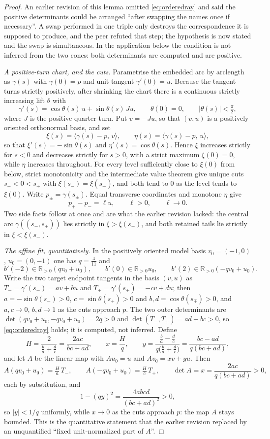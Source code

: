\begin{proof}
An earlier revision of this lemma omitted \eqref{eq:orderedray} and said the
positive determinants could be arranged ``after swapping the names once if
necessary''. A swap performed in one triple only destroys the correspondence it
is supposed to produce, and the peer refuted that step; the hypothesis is now
stated and the swap is simultaneous. In the application below the condition is
not inferred from the two cones: both determinants are computed and are
positive.

\emph{A positive-turn chart, and the cuts.} Parametrise the embedded arc by
arclength as $\gamma(s)$ with $\gamma(0)=p$ and unit tangent $\gamma'(0)=u$.
Because the tangent turns strictly positively, after shrinking the chart there
is a continuous strictly increasing lift $\theta$ with
\[
   \gamma'(s)=\cos\theta(s)\,u+\sin\theta(s)\,Ju,\qquad
   \theta(0)=0,\qquad |\theta(s)|<\tfrac\pi2,
\]
where $J$ is the positive quarter turn. Put $v=-Ju$, so that $(v,u)$ is a
positively oriented orthonormal basis, and set
\[
   \xi(s)=\langle\gamma(s)-p,\,v\rangle,\qquad
   \eta(s)=\langle\gamma(s)-p,\,u\rangle,
\]
so that $\xi'(s)=-\sin\theta(s)$ and $\eta'(s)=\cos\theta(s)$. Hence $\xi$
increases strictly for $s<0$ and decreases strictly for $s>0$, with a strict
maximum $\xi(0)=0$, while $\eta$ increases throughout. For every level
sufficiently close to $\xi(0)$ from below, strict monotonicity and the
intermediate value theorem give unique cuts $s_-<0<s_+$ with
$\xi(s_-)=\xi(s_+)$, and both tend to $0$ as the level tends to $\xi(0)$. Write
$p_\pm=\gamma(s_\pm)$. Equal transverse coordinates and monotone $\eta$ give
\[
   p_+-p_-=\ell u,\qquad \ell>0,\qquad \ell\to0 .
\]
Two side facts follow at once and are what the earlier revision lacked: the
central arc $\gamma((s_-,s_+))$ lies strictly in $\xi>\xi(s_-)$, and both
retained tails lie strictly in $\xi<\xi(s_-)$.

\emph{The affine fit, quantitatively.} In the positively oriented model basis
$v_0=(-1,0)$, $u_0=(0,-1)$ one has $q=\tfrac4{11}$ and
\[
   b'(-2)\in\mathbb R_{>0}(qv_0+u_0),\qquad
   b'(0)\in\mathbb R_{>0}u_0,\qquad
   b'(2)\in\mathbb R_{>0}(-qv_0+u_0).
\]
Write the two target endpoint tangents in the basis $(v,u)$ as
$T_-=\gamma'(s_-)=av+bu$ and $T_+=\gamma'(s_+)=-cv+du$; then
$a=-\sin\theta(s_-)>0$, $c=\sin\theta(s_+)>0$ and $b,d=\cos\theta(s_\mp)>0$,
and $a,c\to0$, $b,d\to1$ as the cuts approach $p$. The two outer determinants
are $\det(qv_0+u_0,-qv_0+u_0)=2q>0$ and $\det(T_-,T_+)=ad+bc>0$, so
\eqref{eq:orderedray} holds; it is computed, not inferred. Define
\[
   H=\frac{2}{\tfrac ba+\tfrac dc}=\frac{2ac}{bc+ad},\qquad
   x=\frac Hq,\qquad
   y=\frac{\tfrac ba-\tfrac dc}{q\bigl(\tfrac ba+\tfrac dc\bigr)}
    =\frac{bc-ad}{q(bc+ad)},
\]
and let $A$ be the linear map with $A u_0=u$ and $Av_0=xv+yu$. Then
\[
   A(qv_0+u_0)=\tfrac Ha\,T_-,\qquad
   A(-qv_0+u_0)=\tfrac Hc\,T_+,\qquad
   \det A=x=\frac{2ac}{q(bc+ad)}>0,
\]
each by substitution, and
\[
   1-(qy)^2=\frac{4abcd}{(bc+ad)^2}>0,
\]
so $|y|<1/q$ uniformly, while $x\to0$ as the cuts approach $p$: the map $A$
stays bounded. This is the quantitative statement that the earlier revision
replaced by an unquantified ``fixed unit-normalized part of $A$''.


\end{proof}
